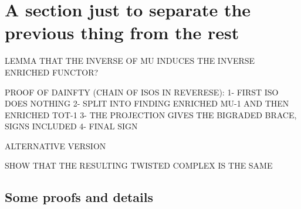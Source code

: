 \documentclass[twoside]{article}
\begin{document}
\section{A section just to separate the previous thing from the rest}
LEMMA THAT THE INVERSE OF MU INDUCES THE INVERSE ENRICHED FUNCTOR?

PROOF OF DAINFTY (CHAIN OF ISOS IN REVERESE):
1- FIRST ISO DOES NOTHING
2- SPLIT INTO FINDING ENRICHED MU-1 AND THEN ENRICHED TOT-1
3- THE PROJECTION GIVES THE BIGRADED BRACE, SIGNS INCLUDED
4- FINAL SIGN


ALTERNATIVE VERSION

SHOW THAT THE  RESULTING TWISTED COMPLEX IS THE SAME
\begin{appendices}
\appendix
\gdef\thesection{Appendix \Alph{section}}
\section{Some proofs and details}




\end{appendices}


\end{document}
